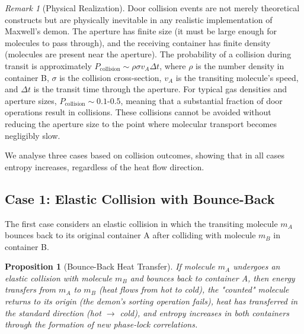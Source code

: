 \documentclass[12pt,a4paper]{article}
\newtheorem{proposition}[theorem]{Proposition}
\theoremstyle{definition}
\theoremstyle{remark}
\newtheorem{remark}[theorem]{Remark}
\begin{document}
\begin{remark}[Physical Realization]
\label{rem:collision_physical}
Door collision events are not merely theoretical constructs but are physically inevitable in any realistic implementation of Maxwell's demon. The aperture has finite size (it must be large enough for molecules to pass through), and the receiving container has finite density (molecules are present near the aperture). The probability of a collision during transit is approximately $P_{\text{collision}} \sim \rho \sigma v_A \Delta t$, where $\rho$ is the number density in container B, $\sigma$ is the collision cross-section, $v_A$ is the transiting molecule's speed, and $\Delta t$ is the transit time through the aperture. For typical gas densities and aperture sizes, $P_{\text{collision}} \sim 0.1$-$0.5$, meaning that a substantial fraction of door operations result in collisions. These collisions cannot be avoided without reducing the aperture size to the point where molecular transport becomes negligibly slow.
\end{remark}

We analyse three cases based on collision outcomes, showing that in all cases entropy increases, regardless of the heat flow direction.

\subsection{Case 1: Elastic Collision with Bounce-Back}

The first case considers an elastic collision in which the transiting molecule $m_A$ bounces back to its original container A after colliding with molecule $m_B$ in container B.

\begin{proposition}[Bounce-Back Heat Transfer]
\label{prop:bounce_back}
If molecule $m_A$ undergoes an elastic collision with molecule $m_B$ and bounces back to container A, then energy transfers from $m_A$ to $m_B$ (heat flows from hot to cold), the "counted" molecule returns to its origin (the demon's sorting operation fails), heat has transferred in the standard direction (hot $\to$ cold), and entropy increases in both containers through the formation of new phase-lock correlations.
\end{proposition}
\end{document}
